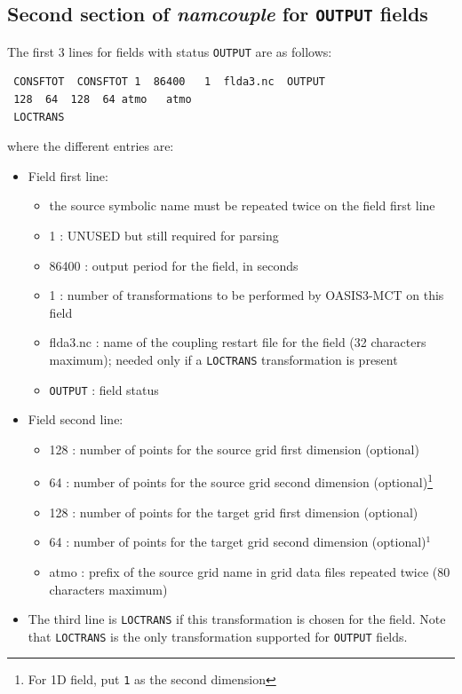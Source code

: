 \subsection{Second section of {\it namcouple} for {\tt OUTPUT} fields}
\label{subsubsec_secondOUTPUT}
The first 3 lines for fields with status {\tt OUTPUT} are as follows:
  \begin{verbatim}
 CONSFTOT  CONSFTOT 1  86400   1  flda3.nc  OUTPUT
 128  64  128  64 atmo   atmo 
 LOCTRANS
\end{verbatim}
where the different entries are:
\begin{itemize}
  \item Field first line:
    \begin{itemize}
    \item the source symbolic name must be repeated twice on the field
      first line
    \item 1 : UNUSED but still required for parsing
    \item 86400 : output period for the field, in seconds
    \item 1 : number of transformations to be performed by OASIS3-MCT
      on this field
    \item flda3.nc : name of the coupling restart file for the field
      (32 characters maximum); needed only if  a {\tt LOCTRANS} transformation is present
    \item {\tt OUTPUT} : field status
    \end{itemize}
  \item Field second line:
    \begin{itemize}
    \item 128 : number of points for the source grid first dimension (optional)
    \item 64 : number of points for the source grid second dimension (optional)\footnote{For 1D field, put {\tt 1} as the second dimension}
    \item 128 : number of points for the target grid first dimension (optional)
    \item 64 : number of points for the target grid second dimension (optional)$^{1}$
    \item atmo : prefix of the source grid name in grid data files repeated twice (80 characters maximum)
    \end{itemize}
  \item The third line is {\tt LOCTRANS} if this transformation is chosen for
the field. Note that {\tt LOCTRANS} is the only transformation
supported for {\tt OUTPUT} fields.
\end{itemize}

